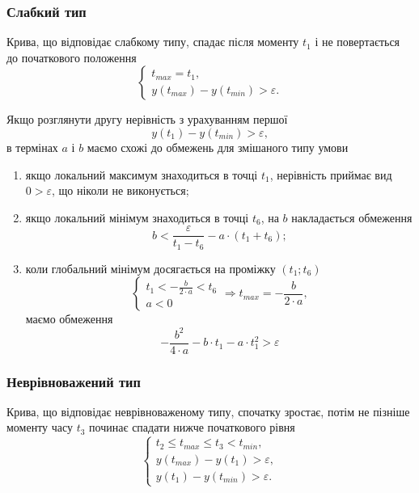\subsubsection{Слабкий тип}
Крива, що відповідає слабкому типу, спадає після моменту $t_1$
і не повертається до початкового положення
\begin{equation*}
  \begin{cases}
    t_{max} = t_1, \\
    y\left( t_{max} \right) - y\left( t_{min} \right) > \varepsilon.
  \end{cases}
\end{equation*}

Якщо розглянути другу нерівність з урахуванням першої
\begin{equation*}
  y\left( t_1 \right) - y\left( t_{min} \right) > \varepsilon,
\end{equation*}
в термінах $a$ і $b$ маємо схожі до обмежень для змішаного типу умови
\begin{enumerate}
  \item
    якщо локальний максимум знаходиться в точці $t_1$, нерівність приймає вид
    $0 > \varepsilon$, що ніколи не виконується;
  \item
    якщо локальний мінімум знаходиться в точці $t_6$, на $b$ накладається
    обмеження
    \begin{equation*}
      b < \frac{\varepsilon}{t_1 - t_6} - a \cdot \left( t_1 + t_6 \right);
    \end{equation*}
  \item
    коли глобальний мінімум досягається на проміжку $\left( t_1; t_6 \right)$
    \begin{equation*}
      \begin{cases}
        t_1 < - \frac{b}{2 \cdot a} < t_6 \\
        a < 0
      \end{cases} \Rightarrow
      t_{max} = - \frac{b}{2 \cdot a},
    \end{equation*}
    маємо обмеження
    \begin{equation*}
      - \frac{b^2}{4 \cdot a} - b \cdot t_1 - a \cdot t_1^2
      > \varepsilon
    \end{equation*}
\end{enumerate}

\subsubsection{Неврівноважений тип}
Крива, що відповідає неврівноваженому типу, спочатку зростає,
потім не пізніше моменту часу $t_3$ починає спадати нижче початкового рівня
\begin{equation*}
  \begin{cases}
    t_2 \le t_{max} \le t_3 < t_{min}, \\
    y\left( t_{max} \right) - y\left( t_1\right) > \varepsilon, \\
    y\left( t_1 \right) - y\left( t_{min} \right) > \varepsilon.
  \end{cases}
\end{equation*}

